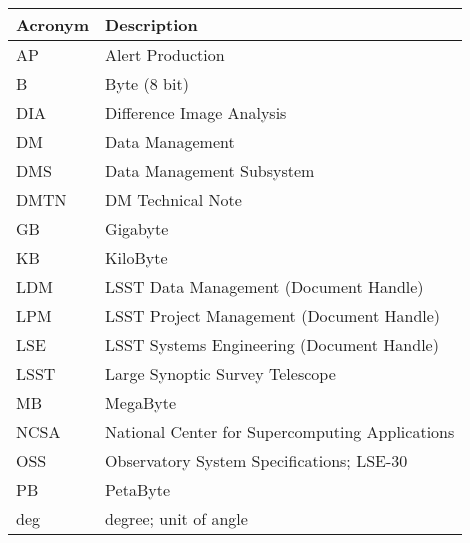 \addtocounter{table}{-1}
\begin{longtable}{p{}p{}}\hline
\textbf{Acronym} & \textbf{Description}  \\\hline

AP & Alert Production \\\hline
B & Byte (8 bit) \\\hline
DIA & Difference Image Analysis \\\hline
DM & Data Management \\\hline
DMS & Data Management Subsystem \\\hline
DMTN & DM Technical Note \\\hline
GB & Gigabyte \\\hline
KB & KiloByte \\\hline
LDM & LSST Data Management (Document Handle) \\\hline
LPM & LSST Project Management (Document Handle) \\\hline
LSE & LSST Systems Engineering (Document Handle) \\\hline
LSST & Large Synoptic Survey Telescope \\\hline
MB & MegaByte \\\hline
NCSA & National Center for Supercomputing Applications \\\hline
OSS & Observatory System Specifications; LSE-30 \\\hline
PB & PetaByte \\\hline
deg & degree; unit of angle \\\hline
\end{longtable}
